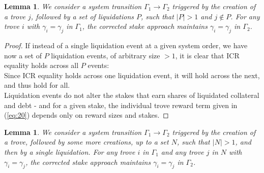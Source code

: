 \documentclass[reqno]{article}
\newtheorem{lemma}[theorem]{Lemma}
\begin{document}
\begin{lemma} \label{result:2} We consider a system transition $\Gamma_1 \rightarrow \Gamma_2$ triggered by the creation of a trove $j$, followed by a set of liquidations $P$, such that $|P| > 1$ and $j \notin P$. For any trove $i$ with $\gamma_i = \gamma_j$ in $\Gamma_1$, the corrected stake approach maintains $\gamma_i = \gamma_j$ in $\Gamma_2$.
\end{lemma}

\begin{proof}
If instead of a single liquidation event at a given system order, we have now a set of $P$ liquidation events, of arbitrary size $> 1$, it is clear that ICR equality holds across all $P$ events:\\

Since ICR equality holds across one liquidation event, it will hold across the next, and thus hold for all.\\

Liquidation events do not alter the stakes that earn shares of liquidated collateral and debt - and for a given stake, the individual trove reward term given in (\ref{eq:20}) depends only on reward sizes and stakes.
\end{proof}

\begin{lemma} \label{result:3}
  We consider a system transition $\Gamma_1 \rightarrow \Gamma_2$ triggered by the creation of a trove, followed by some more creations, up to a set $N$, such that $|N| > 1$, and then by a single liquidation. For any trove $i$ in $\Gamma_1$ and any trove $j$ in $N$ with $\gamma_i = \gamma_j$, the corrected stake approach maintains $\gamma_i = \gamma_j$ in $\Gamma_2$.
\end{lemma}
\end{document}
